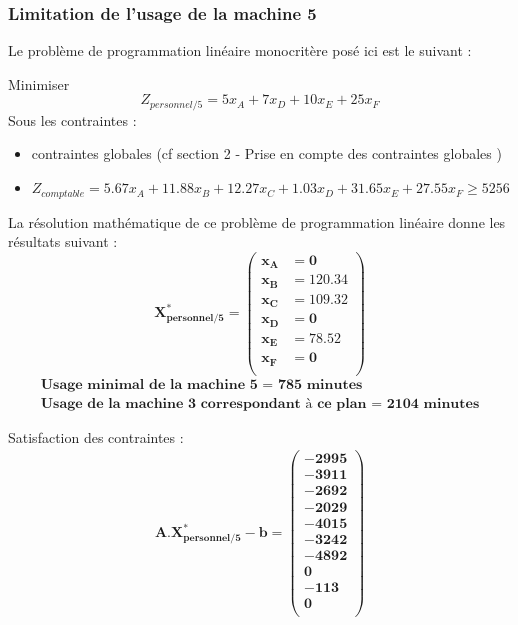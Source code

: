 \documentclass[12pt]{article}
\begin{document}
\subsubsection{Limitation de l'usage de la machine 5}
Le problème de programmation linéaire monocritère posé ici est le suivant :
\begin{tcolorbox}
Minimiser
\begin{equation*}
 Z_{personnel/5}= 5x_{A} + 7x_{D} + 10x_{E} + 25x_{F}
\end{equation*}
Sous les contraintes :
\begin{itemize}
\item contraintes globales (cf section 2 - Prise en compte des contraintes globales )
\item $ Z_{comptable}= 5.67x_{A} +11.88x_{B} +12.27x_{C} +1.03x_{D} +31.65x_{E} +27.55x_{F} \geq 5256$
\end{itemize}
\end{tcolorbox}
La résolution mathématique de ce problème de programmation linéaire donne les résultats suivant :\\
\begin{equation*}
\boldsymbol{X^{*}_{personnel/5} = 
   \left (
   \begin{aligned}
      x_{A} &= 0 \\
      x_{B} &= 120.34 \\
      x_{C} &= 109.32 \\
      x_{D} &= 0 \\
      x_{E} &= 78.52 \\ 
      x_{F} &= 0 \\
   \end{aligned}
   \right )
 } 
\end{equation*}
\begin{align*}
\textbf{Usage minimal de la machine 5 = 785 minutes} \\
\textbf{Usage de la machine 3 correspondant à ce plan = 2104 minutes}
\end{align*}


Satisfaction des contraintes : 
\begin{align*}
\boldsymbol{A.X^{*}_{personnel/5} - b = 
   \left (
   \begin{aligned}
      -2995 \\
      -3911 \\
      -2692 \\
      -2029 \\
      -4015 \\
      -3242 \\
      -4892 \\
      0 \\
      -113 \\
      0\\
   \end{aligned}
   \right )
 } 
\end{align*}
\end{document}
